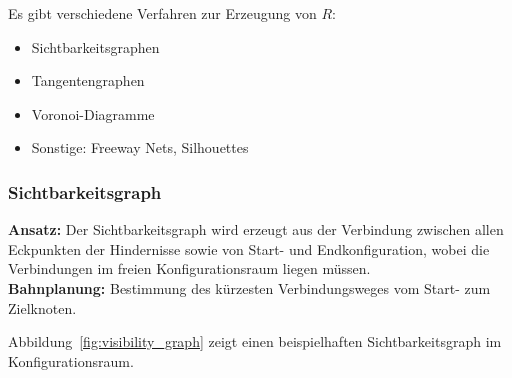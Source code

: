 \documentclass[a4paper, 11pt, accentcolor = tud3b]{tudreport}
\begin{document}
				Es gibt verschiedene Verfahren zur Erzeugung von \(R\):
				\begin{itemize}
					\item Sichtbarkeitsgraphen
					\item Tangentengraphen
					\item Voronoi-Diagramme
					\item Sonstige: Freeway Nets, Silhouettes
				\end{itemize}

				\subsubsection{Sichtbarkeitsgraph}
					\textbf{Ansatz:} Der Sichtbarkeitsgraph wird erzeugt aus der Verbindung zwischen allen Eckpunkten der Hindernisse sowie von Start- und Endkonfiguration, wobei die Verbindungen im freien Konfigurationsraum liegen müssen. \\
					\textbf{Bahnplanung:} Bestimmung des kürzesten Verbindungsweges vom Start- zum Zielknoten.
					
					Abbildung~\ref{fig:visibility_graph} zeigt einen beispielhaften Sichtbarkeitsgraph im Konfigurationsraum.
					
\end{document}
